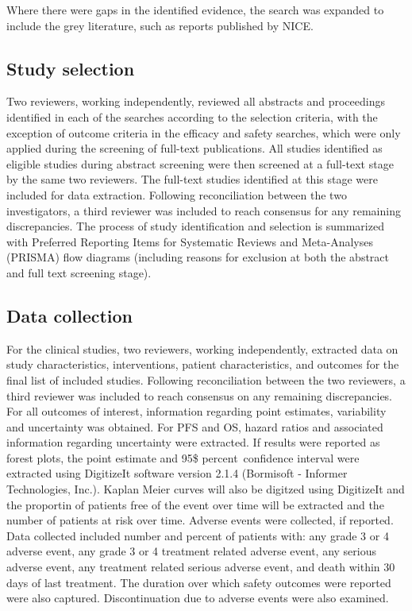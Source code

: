 \documentclass[11pt,final,fleqn]{article}\usepackage[]{graphicx}\usepackage[]{color}
\theoremstyle{plain}
\begin{document}
{\begin{appendices}
Where there were gaps in the identified evidence, the search was expanded to include the grey literature, such as reports published by NICE.

\subsection{Study selection}

Two reviewers, working independently, reviewed all abstracts and proceedings identified in each of the searches according to the selection criteria, with the exception of outcome criteria in the efficacy and safety searches, which were only applied during the screening of full-text publications. All studies identified as eligible studies during abstract screening were then screened at a full-text stage by the same two reviewers. The full-text studies identified at this stage were included for data extraction. Following reconciliation between the two investigators, a third reviewer was included to reach consensus for any remaining discrepancies. The process of study identification and selection is summarized with Preferred Reporting Items for Systematic Reviews and Meta-Analyses (PRISMA) flow diagrams (including reasons for exclusion at both the abstract and full text screening stage). 

\subsection{Data collection}

For the clinical studies, two reviewers, working independently, extracted data on study characteristics, interventions, patient characteristics, and outcomes for the final list of included studies. Following reconciliation between the two reviewers, a third reviewer was included to reach consensus on any remaining discrepancies. For all outcomes of interest, information regarding point estimates, variability and uncertainty was obtained. For PFS and OS, hazard ratios and associated information regarding uncertainty were extracted. If results were reported as forest plots, the point estimate and 95\$ percent\ confidence interval were extracted using DigitizeIt software version 2.1.4 (Bormisoft - Informer Technologies, Inc.). Kaplan Meier curves will also be digitzed using DigitizeIt and the proportin of patients free of the event over time will be extracted and the number of patients at risk over time. Adverse events were collected, if reported. Data collected included number and percent of patients with: any grade 3 or 4 adverse event, any grade 3 or 4 treatment related adverse event, any serious adverse event, any treatment related serious adverse event, and death within 30 days of last treatment. The duration over which safety outcomes were reported were also captured. Discontinuation due to adverse events were also examined. 


\end{appendices}}
\end{document}

